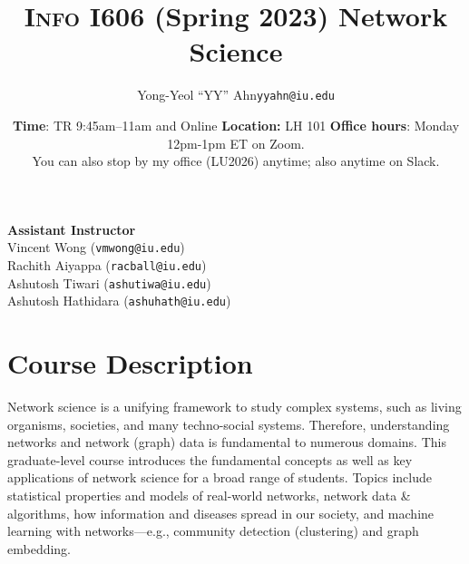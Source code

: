 \documentclass[11pt,article,oneside]{memoir} %
\makeatletter
\def\myauthor{Author}
\def\mytitle{Title}
\def\myemail{yyahn@iu.edu}
\def\myauthor{Yong-Yeol ``YY'' Ahn}
\def\mytitle{{\normalsize \textsc{Info} I606 (Spring 2023) \newline} \HUGE Network Science}
\makeatother
\begin{document}


\def\ind{\hangindent=1 true cm\hangafter=1 \noindent}
\def\labelitemi{$\cdot$}


\title{\LARGE \mytitle}
\author{\Large\myauthor \newline \footnotesize\texttt{\noindent\myemail}}
\date{\textbf{Time}: TR 9:45am--11am and Online%
  \newline \textbf{Location:} LH 101 
\newline \textbf{Office hours}: Monday 12pm-1pm ET on Zoom. \\You can also stop by my office (LU2026) anytime; also anytime on Slack.}

\maketitle
\vspace{-20pt}
{\bfseries Assistant Instructor} \\ 
Vincent Wong (\texttt{vmwong@iu.edu})\\
Rachith Aiyappa (\texttt{racball@iu.edu})\\
Ashutosh Tiwari (\texttt{ashutiwa@iu.edu})\\
Ashutosh Hathidara (\texttt{ashuhath@iu.edu})

\section{Course Description} %

Network science is a unifying framework to study complex systems, such as living organisms, societies, and many techno-social systems. 
Therefore, understanding networks and network (graph) data is fundamental to numerous domains. 
This graduate-level course introduces the fundamental concepts as well as key applications of network science for a broad range of students.
Topics include statistical properties and models of real-world networks, network data \& algorithms, how information and diseases spread in our society, and machine learning with networks---e.g., community detection (clustering) and graph embedding.
\end{document}
